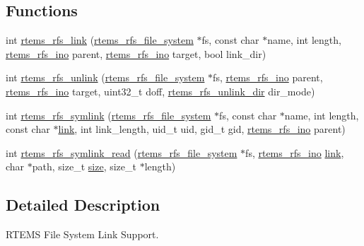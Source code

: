 \subsection*{Functions}
\begin{DoxyCompactItemize}
\item 
int \mbox{\hyperlink{rtems-rfs-link_8h_a21b4f5283c14d67044a3eb7710059e80}{rtems\+\_\+rfs\+\_\+link}} (\mbox{\hyperlink{struct__rtems__rfs__file__system}{rtems\+\_\+rfs\+\_\+file\+\_\+system}} $\ast$fs, const char $\ast$name, int length, \mbox{\hyperlink{rtems-rfs-inode_8h_ae658325c3ff9941f2e68315d20e3c723}{rtems\+\_\+rfs\+\_\+ino}} parent, \mbox{\hyperlink{rtems-rfs-inode_8h_ae658325c3ff9941f2e68315d20e3c723}{rtems\+\_\+rfs\+\_\+ino}} target, bool link\+\_\+dir)
\item 
int \mbox{\hyperlink{rtems-rfs-link_8h_a688547629f6f92228919b7938a1cbfb4}{rtems\+\_\+rfs\+\_\+unlink}} (\mbox{\hyperlink{struct__rtems__rfs__file__system}{rtems\+\_\+rfs\+\_\+file\+\_\+system}} $\ast$fs, \mbox{\hyperlink{rtems-rfs-inode_8h_ae658325c3ff9941f2e68315d20e3c723}{rtems\+\_\+rfs\+\_\+ino}} parent, \mbox{\hyperlink{rtems-rfs-inode_8h_ae658325c3ff9941f2e68315d20e3c723}{rtems\+\_\+rfs\+\_\+ino}} target, uint32\+\_\+t doff, \mbox{\hyperlink{rtems-rfs-link_8h_aa5069a5066794404a5afb31ac6067cd0}{rtems\+\_\+rfs\+\_\+unlink\+\_\+dir}} dir\+\_\+mode)
\item 
int \mbox{\hyperlink{rtems-rfs-link_8h_ad174cb40689aacab6621b9df946bc3f3}{rtems\+\_\+rfs\+\_\+symlink}} (\mbox{\hyperlink{struct__rtems__rfs__file__system}{rtems\+\_\+rfs\+\_\+file\+\_\+system}} $\ast$fs, const char $\ast$name, int length, const char $\ast$\mbox{\hyperlink{link_8c_a8c94afd0b7e5bb4ce95fefd964241f7f}{link}}, int link\+\_\+length, uid\+\_\+t uid, gid\+\_\+t gid, \mbox{\hyperlink{rtems-rfs-inode_8h_ae658325c3ff9941f2e68315d20e3c723}{rtems\+\_\+rfs\+\_\+ino}} parent)
\item 
int \mbox{\hyperlink{rtems-rfs-link_8h_a41b4368e951ea5b33913fd5e1a7d2c80}{rtems\+\_\+rfs\+\_\+symlink\+\_\+read}} (\mbox{\hyperlink{struct__rtems__rfs__file__system}{rtems\+\_\+rfs\+\_\+file\+\_\+system}} $\ast$fs, \mbox{\hyperlink{rtems-rfs-inode_8h_ae658325c3ff9941f2e68315d20e3c723}{rtems\+\_\+rfs\+\_\+ino}} \mbox{\hyperlink{link_8c_a8c94afd0b7e5bb4ce95fefd964241f7f}{link}}, char $\ast$path, size\+\_\+t \mbox{\hyperlink{sun4u_2tte_8h_a245260f6f74972558f61b85227df5aae}{size}}, size\+\_\+t $\ast$length)
\end{DoxyCompactItemize}


\subsection{Detailed Description}
R\+T\+E\+MS File System Link Support. 

